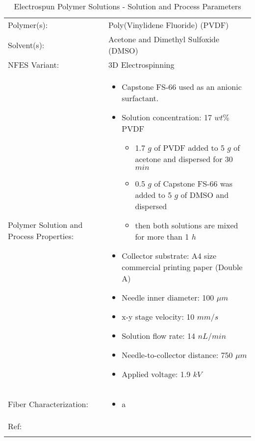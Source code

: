 \begin{table}[th]
\caption{Electrospun Polymer Solutions - Solution and Process Parameters}
\begin{center}
\begin{tabular}{
>{\raggedright\arraybackslash}p{}
>{\raggedright\arraybackslash}p{} }

\hline
Polymer(s): &
Poly(Vinylidene Fluoride) (PVDF) \\

\arrayrulecolor{lightgray}\hline
Solvent(s): &
Acetone and Dimethyl Sulfoxide (DMSO) \\

\hline
NFES Variant: &
3D Electrospinning \\

\hline
Polymer Solution and Process Properties: &
\begin{itemize}[leftmargin=*]
\item Capstone FS-66 used as an anionic surfactant.
\item Solution concentration: 17 $w t \%$ PVDF
    \begin{itemize}[leftmargin=*]
    \item 1.7 $g$ of PVDF added to 5 $g$ of acetone and dispersed for 30 $min$
    \item 0.5 $g$ of Capstone FS-66 was added to 5 $g$ of DMSO and dispersed
    \item then both solutions are mixed for more than 1 $h$
    \end{itemize}
\item Collector substrate: A4 size commercial printing paper (Double A)
\item Needle inner diameter: 100 $\mu m$
\item x-y stage velocity: 10 $m m / s$
\item Solution flow rate: 14 $n L / min$
\item Needle-to-collector distance: 750 $\mu m$
\item Applied voltage: 1.9 $k V$
\end{itemize} \\

\hline
Fiber Characterization: &
\begin{itemize}[leftmargin=*]
\item a
\end{itemize} \\

\hline
Ref: & \cite{Kim2018} \\ %
\arrayrulecolor{black}\hline
\label{tbl:FloresCompare}
\end{tabular}
\end{center}
\end{table}

